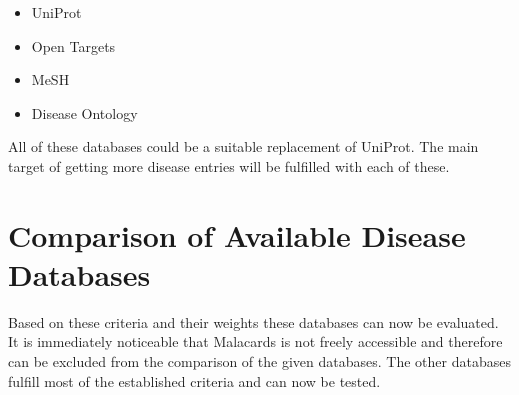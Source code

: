 \begin{itemize} 
\item \ac{UniProt} 
\item Open Targets 
\item \ac{MeSH} 
\item Disease Ontology 
\end{itemize}

All of these databases could be a suitable replacement of \ac{UniProt}. The main target of getting more disease entries will be fulfilled with each of these. 

\section{Comparison of Available Disease Databases}
Based on these criteria and their weights these databases can now be evaluated. It is immediately noticeable that Malacards is not freely accessible and therefore can be excluded from the comparison of the given databases. The other databases fulfill most of the established criteria and can now be tested.

